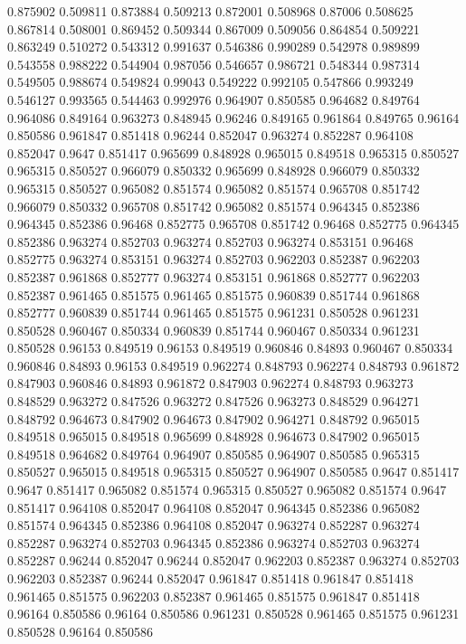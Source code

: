 0.875902 0.509811
0.873884 0.509213
0.872001 0.508968
0.87006 0.508625
0.867814 0.508001
0.869452 0.509344
0.867009 0.509056
0.864854 0.509221
0.863249 0.510272
0.543312 0.991637
0.546386 0.990289
0.542978 0.989899
0.543558 0.988222
0.544904 0.987056
0.546657 0.986721
0.548344 0.987314
0.549505 0.988674
0.549824 0.99043
0.549222 0.992105
0.547866 0.993249
0.546127 0.993565
0.544463 0.992976
0.964907 0.850585
0.964682 0.849764
0.964086 0.849164
0.963273 0.848945
0.96246 0.849165
0.961864 0.849765
0.96164 0.850586
0.961847 0.851418
0.96244 0.852047
0.963274 0.852287
0.964108 0.852047
0.9647 0.851417
0.965699 0.848928
0.965015 0.849518
0.965315 0.850527
0.965315 0.850527
0.966079 0.850332
0.965699 0.848928
0.966079 0.850332
0.965315 0.850527
0.965082 0.851574
0.965082 0.851574
0.965708 0.851742
0.966079 0.850332
0.965708 0.851742
0.965082 0.851574
0.964345 0.852386
0.964345 0.852386
0.96468 0.852775
0.965708 0.851742
0.96468 0.852775
0.964345 0.852386
0.963274 0.852703
0.963274 0.852703
0.963274 0.853151
0.96468 0.852775
0.963274 0.853151
0.963274 0.852703
0.962203 0.852387
0.962203 0.852387
0.961868 0.852777
0.963274 0.853151
0.961868 0.852777
0.962203 0.852387
0.961465 0.851575
0.961465 0.851575
0.960839 0.851744
0.961868 0.852777
0.960839 0.851744
0.961465 0.851575
0.961231 0.850528
0.961231 0.850528
0.960467 0.850334
0.960839 0.851744
0.960467 0.850334
0.961231 0.850528
0.96153 0.849519
0.96153 0.849519
0.960846 0.84893
0.960467 0.850334
0.960846 0.84893
0.96153 0.849519
0.962274 0.848793
0.962274 0.848793
0.961872 0.847903
0.960846 0.84893
0.961872 0.847903
0.962274 0.848793
0.963273 0.848529
0.963272 0.847526
0.963272 0.847526
0.963273 0.848529
0.964271 0.848792
0.964673 0.847902
0.964673 0.847902
0.964271 0.848792
0.965015 0.849518
0.965015 0.849518
0.965699 0.848928
0.964673 0.847902
0.965015 0.849518
0.964682 0.849764
0.964907 0.850585
0.964907 0.850585
0.965315 0.850527
0.965015 0.849518
0.965315 0.850527
0.964907 0.850585
0.9647 0.851417
0.9647 0.851417
0.965082 0.851574
0.965315 0.850527
0.965082 0.851574
0.9647 0.851417
0.964108 0.852047
0.964108 0.852047
0.964345 0.852386
0.965082 0.851574
0.964345 0.852386
0.964108 0.852047
0.963274 0.852287
0.963274 0.852287
0.963274 0.852703
0.964345 0.852386
0.963274 0.852703
0.963274 0.852287
0.96244 0.852047
0.96244 0.852047
0.962203 0.852387
0.963274 0.852703
0.962203 0.852387
0.96244 0.852047
0.961847 0.851418
0.961847 0.851418
0.961465 0.851575
0.962203 0.852387
0.961465 0.851575
0.961847 0.851418
0.96164 0.850586
0.96164 0.850586
0.961231 0.850528
0.961465 0.851575
0.961231 0.850528
0.96164 0.850586
